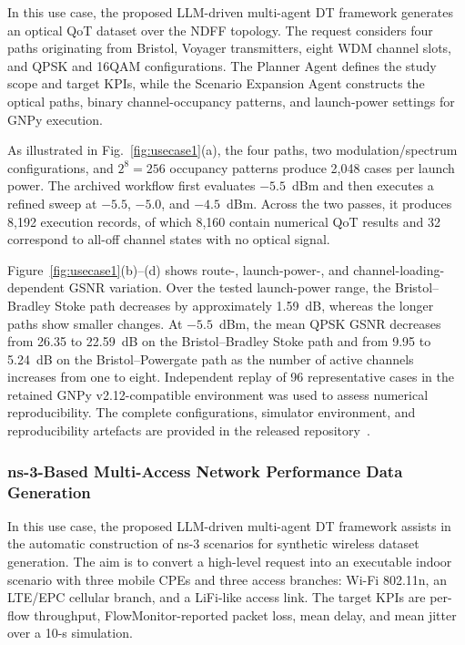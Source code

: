 \documentclass[9pt,twocolumn,twoside]{osajnl}
\begin{document}
In this use case, the proposed LLM-driven multi-agent DT framework generates an optical QoT dataset over the NDFF topology. The request considers four paths originating from Bristol, Voyager transmitters, eight WDM channel slots, and QPSK and 16QAM configurations. The Planner Agent defines the study scope and target KPIs, while the Scenario Expansion Agent constructs the optical paths, binary channel-occupancy patterns, and launch-power settings for GNPy execution.

As illustrated in Fig.~\ref{fig:usecase1}(a), the four paths, two modulation/spectrum configurations, and $2^8=256$ occupancy patterns produce 2,048 cases per launch power. The archived workflow first evaluates $-5.5$~dBm and then executes a refined sweep at $-5.5$, $-5.0$, and $-4.5$~dBm. Across the two passes, it produces 8,192 execution records, of which 8,160 contain numerical QoT results and 32 correspond to all-off channel states with no optical signal.

Figure~\ref{fig:usecase1}(b)--(d) shows route-, launch-power-, and channel-loading-dependent GSNR variation. Over the tested launch-power range, the Bristol--Bradley Stoke path decreases by approximately 1.59~dB, whereas the longer paths show smaller changes. At $-5.5$~dBm, the mean QPSK GSNR decreases from 26.35 to 22.59~dB on the Bristol--Bradley Stoke path and from 9.95 to 5.24~dB on the Bristol--Powergate path as the number of active channels increases from one to eight. Independent replay of 96 representative cases in the retained GNPy v2.12-compatible environment was used to assess numerical reproducibility. The complete configurations, simulator environment, and reproducibility artefacts are provided in the released repository~\cite{Shen_dataset_2026}.


\subsubsection{ns-3-Based Multi-Access Network Performance Data Generation}
\label{sec:ns3_wireless}

In this use case, the proposed LLM-driven multi-agent DT framework assists in the automatic construction of ns-3 scenarios for synthetic wireless dataset generation. The aim is to convert a high-level request into an executable indoor scenario with three mobile CPEs and three access branches: Wi-Fi 802.11n, an LTE/EPC cellular branch, and a LiFi-like access link. The target KPIs are per-flow throughput, FlowMonitor-reported packet loss, mean delay, and mean jitter over a 10-s simulation.
\end{document}
